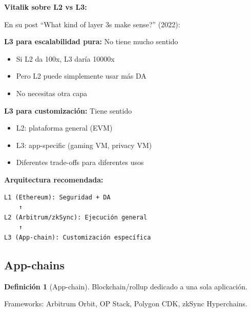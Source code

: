 \documentclass[11pt,a4paper,twoside,openright]{book}
\theoremstyle{definition}
\newtheorem{definition}{Definición}[chapter]
\theoremstyle{plain}
\theoremstyle{remark}
\begin{document}
\begin{mathnote}
\textbf{Vitalik sobre L2 vs L3:}

En su post ``What kind of layer 3s make sense?'' (2022):

\textbf{L3 para escalabilidad pura:} No tiene mucho sentido
\begin{itemize}
    \item Si L2 da 100x, L3 daría 10000x
    \item Pero L2 puede simplemente usar más DA
    \item No necesitas otra capa
\end{itemize}

\textbf{L3 para customización:} Tiene sentido
\begin{itemize}
    \item L2: plataforma general (EVM)
    \item L3: app-specific (gaming VM, privacy VM)
    \item Diferentes trade-offs para diferentes usos
\end{itemize}

\textbf{Arquitectura recomendada:}
\begin{verbatim}
L1 (Ethereum): Seguridad + DA
    ↑
L2 (Arbitrum/zkSync): Ejecución general
    ↑
L3 (App-chain): Customización específica
\end{verbatim}
\end{mathnote}

\subsection{App-chains}

\begin{definition}[App-chain]
Blockchain/rollup dedicado a una sola aplicación.
\end{definition}

Frameworks: Arbitrum Orbit, OP Stack, Polygon CDK, zkSync Hyperchains.
\end{document}
